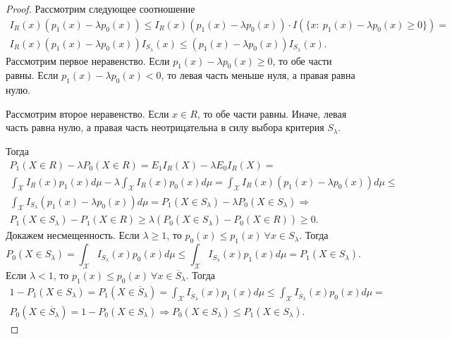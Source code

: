 \begin{proof}
    Рассмотрим следующее соотношение
    \begin{gather*}
        I_{R}( x)( p_{1}( x) -\lambda p_{0}( x)) \leqslant I_{R}( x)( p_{1}( x) -\lambda p_{0}( x)) \cdotp I(\{x:\ p_{1}( x) -\lambda p_{0}( x) \geqslant 0\}) =\\
        I_{R}( x)( p_{1}( x) -\lambda p_{0}( x)) I_{S_{\lambda }}( x) \leqslant ( p_{1}( x) -\lambda p_{0}( x)) I_{S_{\lambda }}( x) .
    \end{gather*}
    Рассмотрим первое неравенство. Если $\displaystyle p_{1}( x) -\lambda p_{0}( x) \geqslant 0$, то обе части равны. Если $\displaystyle p_{1}( x) -\lambda p_{0}( x) < 0$, то левая часть меньше нуля, а правая равна нулю.
    
    Рассмотрим второе неравенство. Если $\displaystyle x\in R$, то обе части равны. Иначе, левая часть равна нулю, а правая часть неотрицательна в силу выбора критерия $\displaystyle S_{\lambda }$.
    
    Тогда
    \begin{gather*}
        P_{1}( X\in R) -\lambda P_{0}( X\in R) =E_{1} I_{R}( X) -\lambda E_{0} I_{R}( X) =\\
        \int _{\mathcal{X}} I_{R}( x) p_{1}( x) d\mu -\lambda \int _{\mathcal{X}} I_{R}( x) p_{0}( x) d\mu =\int _{\mathcal{X}} I_{R}( x)( p_{1}( x) -\lambda p_{0}( x)) d\mu \leqslant \\
        \int _{\mathcal{X}} I_{S_{\lambda }}( p_{1}( x) -\lambda p_{0}( x)) d\mu =P_{1}( X\in S_{\lambda }) -\lambda P_{0}( X\in S_{\lambda }) \Rightarrow \\
        P_{1}( X\in S_{\lambda }) -P_{1}( X\in R) \geqslant \lambda ( P_{0}( X\in S_{\lambda }) -P_{0}( X\in R)) \geqslant 0.
    \end{gather*}
    Докажем несмещенность. Если $\displaystyle \lambda \geqslant 1$, то $\displaystyle p_{0}( x) \leqslant p_{1}( x) \ \forall x\in S_{\lambda }$. Тогда
    \begin{equation*}
        P_{0}( X\in S_{\lambda }) =\int _{\mathcal{X}} I_{S_{\lambda }}( x) p_{0}( x) d\mu \leqslant \int _{\mathcal{X}} I_{S_{\lambda }}( x) p_{1}( x)d\mu =P_{1}( X\in S_{\lambda }) .
    \end{equation*}
    Если $\displaystyle \lambda < 1$, то $\displaystyle p_{1}( x) \leqslant p_{0}( x) \ \forall x\in \overline{S}_{\lambda }$. Тогда
    \begin{gather*}
        1-P_{1}( X\in S_{\lambda }) =P_{1}( X\in \overline{S}_{\lambda }) =\int _{\mathcal{X}} I_{\overline{S}_{\lambda }}( x) p_{1}( x) d\mu \leqslant \int _{\mathcal{X}} I_{\overline{S}_{\lambda }}( x) p_{0}( x) d\mu =\\
        P_{0}( X\in \overline{S}_{\lambda }) =1-P_{0}( X\in S_{\lambda }) \Rightarrow P_{0}( X\in S_{\lambda }) \leqslant P_{1}( X\in S_{\lambda }) .
    \end{gather*}
\end{proof}

